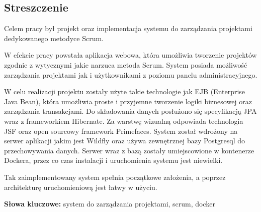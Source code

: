 \subsection*{Streszczenie}

Celem pracy był projekt oraz implementacja systemu do zarządzania projektami dedykowanego metodyce Scrum.

W efekcie pracy powstała aplikacja webowa, która umożliwia tworzenie projektów zgodnie z wytycznymi jakie narzuca metoda Scrum. System posiada możliwość zarządzania projektami jak i użytkownikami z poziomu panelu administracyjnego.

W celu realizacji projektu zostały użyte takie technologie jak EJB (Enterprise Java Bean), która umożliwia proste i przyjemne tworzenie logiki biznesowej oraz zarządzania transakcjami. Do składowania danych posłużono się specyfikacją JPA wraz z frameworkiem Hibernate. Za warstwę wizualną odpowiada technologia JSF oraz open sourcowy framework Primefaces. System został wdrożony na serwer aplikacji jakim jest Wildfly oraz używa zewnętrznej bazy Postgresql do przechowywania danych. Serwer wraz z bazą zostały umiejscowione w kontenerze Dockera, przez co czas instalacji i uruchomienia systemu jest niewielki.

Tak zaimplementowany system spełnia początkowe założenia, a poprzez architekturę uruchomieniową jest łatwy w użyciu.


\vspace{1cm}
\noindent\textbf{Słowa kluczowe:} system do zarządzania projektami, scrum, docker